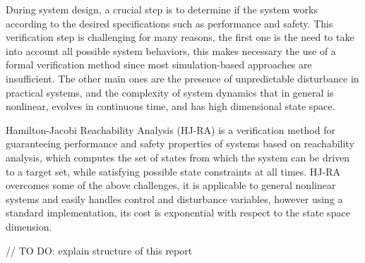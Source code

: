 During system design, a crucial step is to determine if the system works according to the desired specifications such as performance and safety. This verification step is challenging for many reasons, the first one is the need to take into account all possible system behaviors, this makes necessary the use of a formal verification method since most simulation-based approaches are insufficient. The other main ones are the presence of unpredictable disturbance in practical systems, and the complexity of system dynamics that in general is nonlinear, evolves in continuous time, and has high dimensional state space.

Hamilton-Jacobi Reachability Analysis (HJ-RA) is a verification method for guaranteeing performance and safety properties of systems based on reachability analysis, which computes the set of states from which the system can be driven to a target set, while satisfying possible state constraints at all times. HJ-RA overcomes some of the above challenges, it is applicable to general nonlinear systems and easily handles control and disturbance variables, however using a standard implementation, its cost is exponential with respect to the state space dimension.

// TO DO: explain structure of this report